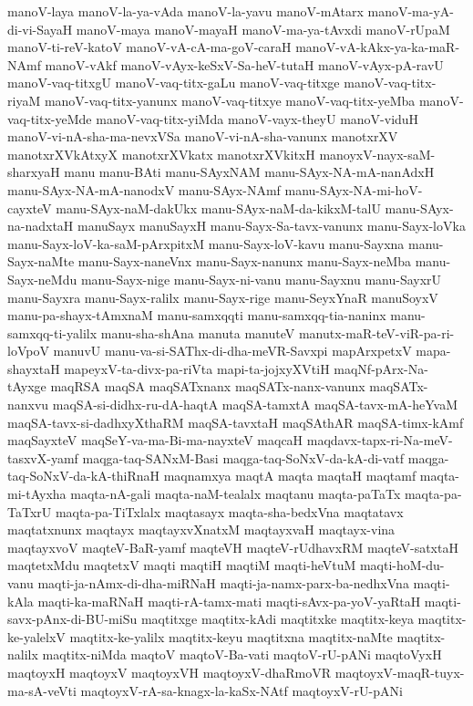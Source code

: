 {manoV-laya
manoV-la-ya-vAda
manoV-la-yavu
manoV-mAtarx
manoV-ma-yA-di-vi-SayaH
manoV-maya
manoV-mayaH
manoV-ma-ya-tAvxdi
manoV-rUpaM
manoV-ti-reV-katoV
manoV-vA-cA-ma-goV-caraH
manoV-vA-kAkx-ya-ka-maR-NAmf
manoV-vAkf
manoV-vAyx-keSxV-Sa-heV-tutaH
manoV-vAyx-pA-ravU
manoV-vaq-titxgU
manoV-vaq-titx-gaLu
manoV-vaq-titxge
manoV-vaq-titx-riyaM
manoV-vaq-titx-yanunx
manoV-vaq-titxye
manoV-vaq-titx-yeMba
manoV-vaq-titx-yeMde
manoV-vaq-titx-yiMda
manoV-vayx-theyU
manoV-viduH
manoV-vi-nA-sha-ma-nevxVSa
manoV-vi-nA-sha-vanunx
manotxrXV
manotxrXVkAtxyX
manotxrXVkatx
manotxrXVkitxH
manoyxV-nayx-saM-sharxyaH
manu
manu-BAti
manu-SAyxNAM
manu-SAyx-NA-mA-nanAdxH
manu-SAyx-NA-mA-nanodxV
manu-SAyx-NAmf
manu-SAyx-NA-mi-hoV-cayxteV
manu-SAyx-naM-dakUkx
manu-SAyx-naM-da-kikxM-talU
manu-SAyx-na-nadxtaH
manuSayx
manuSayxH
manu-Sayx-Sa-tavx-vanunx
manu-Sayx-loVka
manu-Sayx-loV-ka-saM-pArxpitxM
manu-Sayx-loV-kavu
manu-Sayxna
manu-Sayx-naMte
manu-Sayx-naneVnx
manu-Sayx-nanunx
manu-Sayx-neMba
manu-Sayx-neMdu
manu-Sayx-nige
manu-Sayx-ni-vanu
manu-Sayxnu
manu-SayxrU
manu-Sayxra
manu-Sayx-ralilx
manu-Sayx-rige
manu-SeyxYnaR
manuSoyxV
manu-pa-shayx-tAmxnaM
manu-samxqqti
manu-samxqq-tia-naninx
manu-samxqq-ti-yalilx
manu-sha-shAna
manuta
manuteV
manutx-maR-teV-viR-pa-ri-loVpoV
manuvU
manu-va-si-SAThx-di-dha-meVR-Savxpi
mapArxpetxV
mapa-shayxtaH
mapeyxV-ta-divx-pa-riVta
mapi-ta-jojxyXVtiH
maqNf-pArx-Na-tAyxge
maqRSA
maqSA
maqSATxnanx
maqSATx-nanx-vanunx
maqSATx-nanxvu
maqSA-si-didhx-ru-dA-haqtA
maqSA-tamxtA
maqSA-tavx-mA-heYvaM
maqSA-tavx-si-dadhxyXthaRM
maqSA-tavxtaH
maqSAthAR
maqSA-timx-kAmf
maqSayxteV
maqSeY-va-ma-Bi-ma-nayxteV
maqcaH
maqdavx-tapx-ri-Na-meV-tasxvX-yamf
maqga-taq-SANxM-Basi
maqga-taq-SoNxV-da-kA-di-vatf
maqga-taq-SoNxV-da-kA-thiRnaH
maqnamxya
maqtA
maqta
maqtaH
maqtamf
maqta-mi-tAyxha
maqta-nA-gali
maqta-naM-tealalx
maqtanu
maqta-paTaTx
maqta-pa-TaTxrU
maqta-pa-TiTxlalx
maqtasayx
maqta-sha-bedxVna
maqtatavx
maqtatxnunx
maqtayx
maqtayxvXnatxM
maqtayxvaH
maqtayx-vina
maqtayxvoV
maqteV-BaR-yamf
maqteVH
maqteV-rUdhavxRM
maqteV-satxtaH
maqtetxMdu
maqtetxV
maqti
maqtiH
maqtiM
maqti-heVtuM
maqti-hoM-du-vanu
maqti-ja-nAmx-di-dha-miRNaH
maqti-ja-namx-parx-ba-nedhxVna
maqti-kAla
maqti-ka-maRNaH
maqti-rA-tamx-mati
maqti-sAvx-pa-yoV-yaRtaH
maqti-savx-pAnx-di-BU-miSu
maqtitxge
maqtitx-kAdi
maqtitxke
maqtitx-keya
maqtitx-ke-yalelxV
maqtitx-ke-yalilx
maqtitx-keyu
maqtitxna
maqtitx-naMte
maqtitx-nalilx
maqtitx-niMda
maqtoV
maqtoV-Ba-vati
maqtoV-rU-pANi
maqtoVyxH
maqtoyxH
maqtoyxV
maqtoyxVH
maqtoyxV-dhaRmoVR
maqtoyxV-maqR-tuyx-ma-sA-veVti
maqtoyxV-rA-sa-knagx-la-kaSx-NAtf
maqtoyxV-rU-pANi
}
